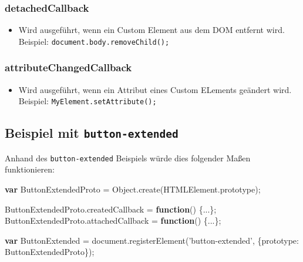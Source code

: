 \documentclass[11pt,a4paper]{report}
\newenvironment{Shaded}{}{}
\newcommand{\KeywordTok}[1]{\textcolor[rgb]{0.00,0.44,0.13}{\textbf{{#1}}}}
\newcommand{\DataTypeTok}[1]{\textcolor[rgb]{0.56,0.13,0.00}{{#1}}}
\newcommand{\StringTok}[1]{\textcolor[rgb]{0.25,0.44,0.63}{{#1}}}
\newcommand{\VariableTok}[1]{\textcolor[rgb]{0.10,0.09,0.49}{{#1}}}
\newcommand{\OperatorTok}[1]{\textcolor[rgb]{0.40,0.40,0.40}{{#1}}}
\newcommand{\AttributeTok}[1]{\textcolor[rgb]{0.49,0.56,0.16}{{#1}}}
\newcommand{\NormalTok}[1]{{#1}}
\providecommand{\tightlist}{%
  \setlength{\itemsep}{0pt}\setlength{\parskip}{0pt}}
\begin{document}
\subsubsection{detachedCallback}\label{detachedcallback}

\begin{itemize}
\tightlist
\item
  Wird ausgeführt, wenn ein Custom Element aus dem DOM entfernt wird.
  Beispiel: \texttt{document.body.removeChild();}
\end{itemize}

\subsubsection{attributeChangedCallback}\label{attributechangedcallback}

\begin{itemize}
\tightlist
\item
  Wird ausgeführt, wenn ein Attribut eines Custom ELements geändert
  wird. Beispiel: \texttt{MyElement.setAttribute();}
\end{itemize}

\subsection{\texorpdfstring{Beispiel mit
\texttt{button-extended}}{Beispiel mit button-extended}}\label{beispiel-mit-button-extended}

Anhand des \texttt{button-extended} Beispiels würde dies folgender Maßen
funktionieren:

\begin{Shaded}
\begin{Highlighting}[]
\KeywordTok{var} \NormalTok{ButtonExtendedProto }\OperatorTok{=} \VariableTok{Object}\NormalTok{.}\AttributeTok{create}\NormalTok{(}\VariableTok{HTMLElement}\NormalTok{.}\AttributeTok{prototype}\NormalTok{)}\OperatorTok{;}

\VariableTok{ButtonExtendedProto}\NormalTok{.}\AttributeTok{createdCallback} \OperatorTok{=} \KeywordTok{function}\NormalTok{() }\OperatorTok{\{}\NormalTok{...}\OperatorTok{\};}
\VariableTok{ButtonExtendedProto}\NormalTok{.}\AttributeTok{attachedCallback} \OperatorTok{=} \KeywordTok{function}\NormalTok{() }\OperatorTok{\{}\NormalTok{...}\OperatorTok{\};}

\KeywordTok{var} \NormalTok{ButtonExtended }\OperatorTok{=} \VariableTok{document}\NormalTok{.}\AttributeTok{registerElement}\NormalTok{(}\StringTok{'button-extended'}\OperatorTok{,} \OperatorTok{\{}\DataTypeTok{prototype}\OperatorTok{:} \NormalTok{ButtonExtendedProto}\OperatorTok{\}}\NormalTok{)}\OperatorTok{;}
\end{Highlighting}
\end{Shaded}
\end{document}
